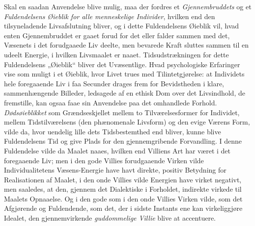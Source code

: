 Skal en saadan Anvendelse blive mulig, maa der fordres et \emph{Gjennembruddets}
og et \emph{Fuldendelsens Øieblik for alle menneskelige Individer}, hvilken end
den tilsyneladende Livsafslutning bliver, og i dette Fuldendelsens Øieblik vil,
hvad enten Gjennembruddet er gaaet forud for det eller falder sammen med det,
Væsenets i det forudgaaede Liv deelte, men bevarede Kraft sluttes sammen til en
udeelt Energie, i hvilken Livsmaalet er naaet. Tidsudstrækningen for dette
Fuldendelsens „Øieblik“ bliver det Uvæsentlige. Hvad psychologiske Erfaringer vise
som muligt i et Øieblik, hvor Livet trues med Tilintetgjørelse: at Individets hele
foregaaende Liv i faa Secunder drages frem for Bevidstheden i klare,
sammenhængende Billeder, ledsagede af en ethisk Dom over det Livsindhold, de
fremstille, kan ogsaa faae sin Anvendelse paa det omhandlede Forhold.
\emph{Dødsøieblikket} som Grændseskjellet mellem to Tilværelsesformer for
Individet, mellem Tidstilværelsens (den phænomenale Livsform) og den evige Værens
Form, vilde da, hvor uendelig lille dets Tidsbestemthed end bliver, kunne blive
Fuldendelsens Tid og give Plads for den gjennemgribende Forvandling. I denne
Fuldendelse vilde da Maalet naaes, hvilken end Villiens Art har været i det
foregaaende Liv; men i den gode Villies forudgaaende Virken vilde
Individualitetens Væsens-Energie have havt direkte, positiv Betydning for
Realisationen af Maalet, i den onde Villies vilde Energien have virket negativt,
men saaledes, at den, gjennem det Dialektiske i Forholdet, indirekte virkede til
Maalets Opnaaelse. Og i den gode som i den onde Villies Virken vilde, som det
Afgjørende og Fuldendende, som det, der i sidste Instants ene kan virkeliggjøre
Idealet, den gjennemvirkende \emph{guddommelige Villie} blive at accentuere.

